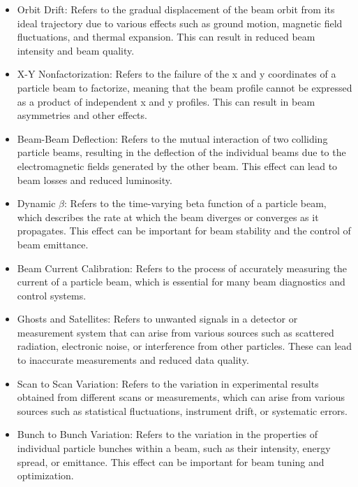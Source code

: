 \begin{itemize}


 \item  Orbit Drift: Refers to the gradual displacement of the beam orbit from its ideal trajectory due to various effects such as ground motion, magnetic field fluctuations, and thermal expansion. This can result in reduced beam intensity and beam quality.

 \item  X-Y Nonfactorization: Refers to the failure of the x and y coordinates of a particle beam to factorize, meaning that the beam profile cannot be expressed as a product of independent x and y profiles. This can result in beam asymmetries and other effects.

 \item Beam-Beam Deflection: Refers to the mutual interaction of two colliding particle beams, resulting in the deflection of the individual beams due to the electromagnetic fields generated by the other beam. This effect can lead to beam losses and reduced luminosity.

 \item Dynamic $\beta$: Refers to the time-varying beta function of a particle beam, which describes the rate at which the beam diverges or converges as it propagates. This effect can be important for beam stability and the control of beam emittance.


\item Beam Current Calibration: Refers to the process of accurately measuring the current of a particle beam, which is essential for many beam diagnostics and control systems.

\item Ghosts and Satellites: Refers to unwanted signals in a detector or measurement system that can arise from various sources such as scattered radiation, electronic noise, or interference from other particles. These can lead to inaccurate measurements and reduced data quality.

\item Scan to Scan Variation: Refers to the variation in experimental results obtained from different scans or measurements, which can arise from various sources such as statistical fluctuations, instrument drift, or systematic errors.

\item Bunch to Bunch Variation: Refers to the variation in the properties of individual particle bunches within a beam, such as their intensity, energy spread, or emittance. This effect can be important for beam tuning and optimization.


\end{itemize}
